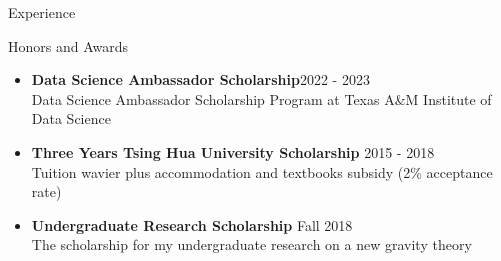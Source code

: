 \documentclass{resume}
\begin{document}
\begin{rSection}{Experience}
\end{rSection}


\vspace{-0.25em}
\begin{rSection}{Honors and Awards}
    \begin{itemize}
        \item \textbf{Data Science Ambassador Scholarship}\hfill 2022 - 2023\\
        Data Science Ambassador Scholarship Program at Texas A\&M Institute of Data Science
        \item \textbf{Three Years Tsing Hua University Scholarship} \hfill 2015 - 2018 \\
        Tuition wavier plus accommodation and textbooks subsidy (2\% acceptance rate)
        \item \textbf{Undergraduate Research Scholarship} \hfill Fall 2018 \\
        The scholarship for my undergraduate research on a new gravity theory
    \end{itemize}
\end{rSection}
\end{document}
